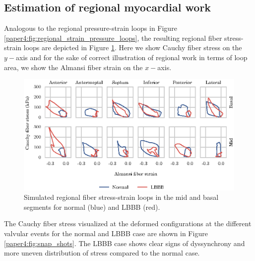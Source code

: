 \subsection{Estimation of regional myocardial work}

Analogous to the regional pressure-strain loops in Figure
\ref{paper4:fig:regional_strain_pressure_loops}, the resulting regional fiber
stress-strain loops are depicted in Figure
\ref{paper4:fig:regional_fiber_stress_strain_loops}. Here we show Cauchy
fiber stress on the $y-$axis and for the sake of correct illustration
of regional work in terms of loop area, we show the Almansi fiber
strain on the $x-$axis. 

\begin{figure}[htbp]
  \centering
  \includegraphics{figures/fiber_stress_strain_loop}
  \caption{\label{paper4:fig:regional_fiber_stress_strain_loops}Simulated
    regional fiber stress-strain loops in the mid and basal segments
    for normal (blue) and LBBB (red). } 
\end{figure}

The Cauchy fiber stress visualized at the deformed configurations at
the different valvular events for the normal and LBBB case are shown
in Figure \ref{paper4:fig:snap_shots}. The LBBB case shows clear signs of
dyssynchrony and more uneven distribution of stress compared to the
normal case. 

